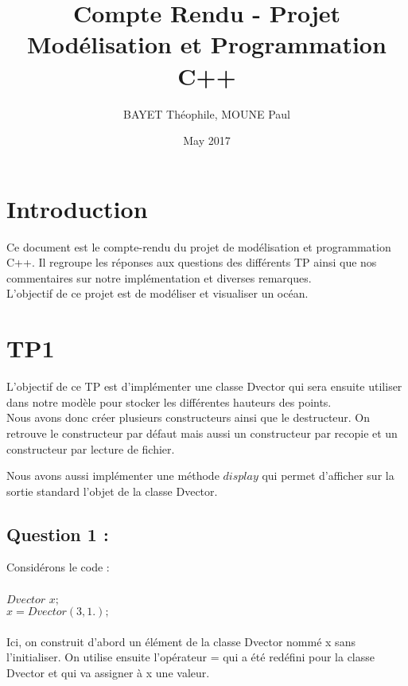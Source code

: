 \documentclass{article}
\title{Compte Rendu - Projet Modélisation et Programmation C++}
\author{BAYET Théophile, MOUNE Paul}
\date{May 2017}
\begin{document}
\maketitle

\section{Introduction}

Ce document est le compte-rendu du projet de modélisation et programmation C++. Il regroupe les réponses aux questions des
différents TP ainsi que nos commentaires sur notre implémentation et diverses remarques. \\
L'objectif de ce projet est de modéliser et visualiser un océan.

\vspace{1cm}

\section{TP1}

L'objectif de ce TP est d'implémenter une classe Dvector qui sera ensuite utiliser dans notre modèle pour stocker les différentes hauteurs des points. \\

Nous avons donc créer plusieurs constructeurs ainsi que le destructeur. On retrouve le constructeur par défaut mais aussi un constructeur par recopie et un constructeur par lecture de fichier.

Nous avons aussi implémenter une méthode $display$ qui permet d'afficher sur la sortie standard l'objet de la classe Dvector.

\vspace{0.5cm}
\subsection{Question 1 :}

Considérons le code : \\ \\ $Dvector$ $x;$ \\ $x = Dvector(3, 1.);$ \\ \\

Ici, on construit d'abord un élément de la classe Dvector nommé x sans l'initialiser.
On utilise ensuite l'opérateur = qui a été redéfini pour la classe Dvector et qui va assigner à x une valeur.

\\ \\
\end{document}
